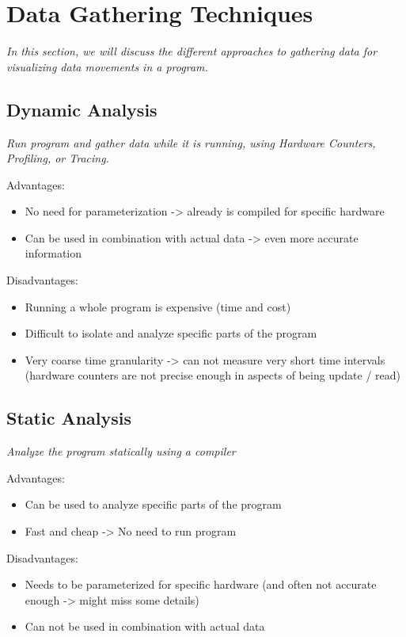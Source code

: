 \section{Data Gathering Techniques}\label{sec:data_gathering}
\textit{In this section, we will discuss the different approaches to gathering data for visualizing data movements in a program.}

\subsection{Dynamic Analysis}\label{sec:dynamic_analysis}
\textit{Run program and gather data while it is running, using Hardware Counters, Profiling, or Tracing.}

Advantages:
\begin{itemize}
  \item No need for parameterization -> already is compiled for specific hardware
  \item Can be used in combination with actual data -> even more accurate information
\end{itemize}
Disadvantages:
\begin{itemize}
  \item Running a whole program is expensive (time and cost)
  \item Difficult to isolate and analyze specific parts of the program
  \item Very coarse time granularity -> can not measure very short time intervals (hardware counters are not precise enough in aspects of being update / read)
\end{itemize}

\subsection{Static Analysis}\label{sec:static_analysis}
\textit{Analyze the program statically using a compiler}

Advantages:
\begin{itemize}
  \item Can be used to analyze specific parts of the program
  \item Fast and cheap -> No need to run program
\end{itemize}
Disadvantages:
\begin{itemize}
  \item Needs to be parameterized for specific hardware (and often not accurate enough -> might miss some details)
  \item Can not be used in combination with actual data
\end{itemize}

